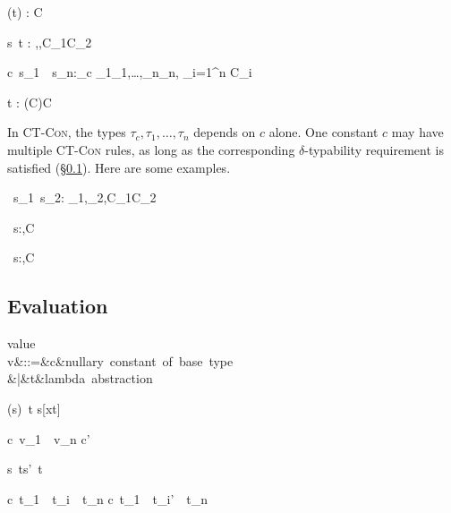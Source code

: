 \documentclass{amsart}
\theoremstyle{definition}
\begin{document}
{\Gamma\vdash (t) : \sigma\R\tau \Given C}

{\Gamma\vdash s~t : \beta \Given
\sigma\Sub\alpha\R\beta,\tau\Sub\alpha,C_1\cup C_2}

{\Gamma\vdash c~s_1~\cdots~s_n:\tau_c\Given
\sigma_1\Sub\tau_1,\ldots,\sigma_n\Sub\tau_n,
{\textstyle\bigcup_{i=1}^n C_i}
}

{\Gamma\vdash t : (\sigma\R\tau\Given C)\Given C}

In \textsc{CT-Con}, the types $\tau_c,\tau_1,\ldots,\tau_n$
depends on $c$ alone. One constant $c$ may have multiple
\textsc{CT-Con} rules, as long as the corresponding
$\delta$-typability requirement is satisfied
(\S\ref{eval}). Here are some examples.

{\Gamma\vdash\Add~s_1~s_2:
\Int\Given\sigma_1\Sub\Int,\sigma_2\Sub\Int,C_1\cup C_2}

{\Gamma\vdash\If~s:\alpha\R\alpha\R\alpha\Given\sigma\Sub\Bool,C}

{\Gamma\vdash\Fix~s:\alpha\Given\sigma\Sub \alpha\R\alpha,C}

\subsection{Evaluation}
\label{eval}

\begin{syntax}
\mbox{value}\\
v&::=&c&\mbox{nullary constant of base type}\\
&|&t&\mbox{lambda abstraction}
\end{syntax}

\infrule[$\beta$]
{}
{(s)~t \Red s[x\mapsto t]}

\infrule[$\delta$]
{}
{c~v_1~\cdots~v_n \Red c'}

{s~t\Red s'~t}

{c~t_1~\cdots~t_i~\cdots~t_n
\Red
c~t_1~\cdots~t_i'~\cdots~t_n
}
\end{document}

